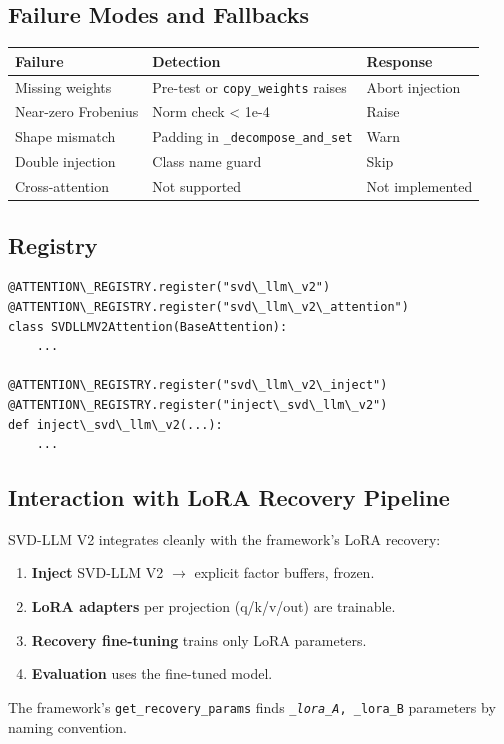 \subsection{Failure Modes and Fallbacks}

\begin{table}[H]
\centering
\small
\begin{tabular}{lll}
\toprule
\textbf{Failure} & \textbf{Detection} & \textbf{Response} \\
\midrule
Missing weights & Pre-test or \texttt{copy\_weights} raises & Abort injection \\
Near-zero Frobenius & Norm check \textless{} 1e-4 & Raise \\
Shape mismatch & Padding in \texttt{\_decompose\_and\_set} & Warn \\
Double injection & Class name guard & Skip \\
Cross-attention & Not supported & Not implemented \\
\bottomrule
\end{tabular}
\end{table}

\subsection{Registry}

\begin{lstlisting}
@ATTENTION\_REGISTRY.register("svd\_llm\_v2")
@ATTENTION\_REGISTRY.register("svd\_llm\_v2\_attention")
class SVDLLMV2Attention(BaseAttention):
    ...

@ATTENTION\_REGISTRY.register("svd\_llm\_v2\_inject")
@ATTENTION\_REGISTRY.register("inject\_svd\_llm\_v2")
def inject\_svd\_llm\_v2(...):
    ...
\end{lstlisting}

\subsection{Interaction with LoRA Recovery Pipeline}

SVD-LLM V2 integrates cleanly with the framework's LoRA recovery:

\begin{enumerate}
\item \textbf{Inject} SVD-LLM V2 $\to$ explicit factor buffers, frozen.
\item \textbf{LoRA adapters} per projection (q/k/v/out) are trainable.
\item \textbf{Recovery fine-tuning} trains only LoRA parameters.
\item \textbf{Evaluation} uses the fine-tuned model.

\end{enumerate}
The framework's \texttt{get\_recovery\_params} finds \texttt{\textit{\_lora\_A}, \texttt{}\_lora\_B} 
parameters by naming convention.

